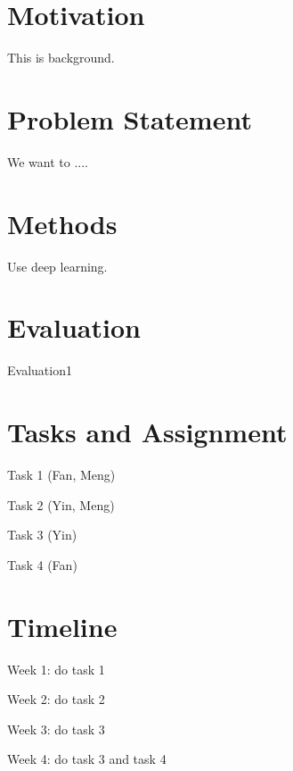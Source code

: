 \section{Motivation}

This is background. 

\section{Problem Statement}

We want to ....

\section{Methods}
\begin{compactitem}
\item Use deep learning. 
\end{compactitem}



\section{Evaluation}
\begin{compactitem}
\item Evaluation1
\end{compactitem}

\section{Tasks and Assignment}

\begin{compactitem}
\item Task 1 (Fan, Meng)
\item Task 2 (Yin, Meng)
\item Task 3 (Yin)
\item Task 4 (Fan)
\end{compactitem}


\section{Timeline}
\begin{compactitem}
\item Week 1: do task 1
\item Week 2: do task 2
\item Week 3: do task 3
\item Week 4: do task 3 and task 4
\end{compactitem}



